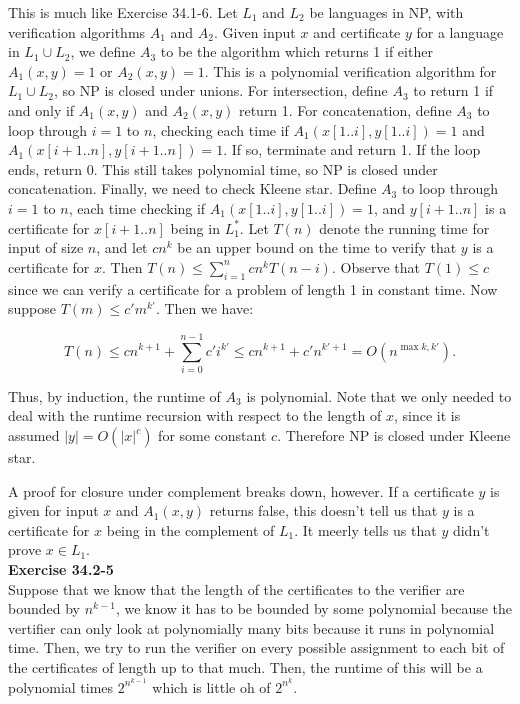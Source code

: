 \documentclass{article}
\begin{document}
This is much like Exercise 34.1-6.  Let $L_1$ and $L_2$ be languages in NP, with verification algorithms $A_1$ and $A_2$.  Given input $x$ and certificate $y$ for a language in $L_1 \cup L_2$, we define $A_3$ to be the algorithm which returns 1 if either $A_1(x,y) = 1$ or $A_2(x,y) = 1$. This is a polynomial verification algorithm for $L_1 \cup L_2$, so NP is closed under unions. For intersection, define $A_3$ to return 1 if and only if $A_1(x,y)$ and $A_2(x,y)$ return 1.  For concatenation, define $A_3$ to loop through $i=1$ to $n$, checking each time if $A_1(x[1..i], y[1..i]) = 1$ and $A_1(x[i+1..n],y[i+1..n])=1$.  If so, terminate and return 1. If the loop ends, return 0.  This still takes polynomial time, so NP is closed under concatenation.  Finally, we need to check Kleene star.  Define $A_3$ to loop through $i=1$ to $n$, each time checking if $A_1(x[1..i], y[1..i]) = 1$, and $y[i+1..n]$ is a certificate for $x[i+1..n]$ being in $L_1^*$.  Let $T(n)$ denote the running time for input of size $n$, and let $cn^k$ be an upper bound on the time to verify that $y$ is a certificate for $x$.  Then $T(n) \leq \sum_{i=1}^n cn^k T(n-i)$.  Observe that $T(1) \leq c$ since we can verify a certificate for a problem of length 1 in constant time.  Now suppose $T(m) \leq c'm^{k'}$.  Then we have:

\[ T(n) \leq cn^{k+1} + \sum_{i=0}^{n-1} c'i^{k'} \leq cn^{k+1} + c'n^{k'+1} = O(n^{\max{k, k'}}).\]

Thus, by induction, the runtime of $A_3$ is polynomial.  Note that we only needed to deal with the runtime recursion with respect to the length of $x$, since it is assumed $|y| = O(|x|^c)$ for some constant $c$.  Therefore NP is closed under Kleene star. 

A proof for closure under complement breaks down, however.  If a certificate $y$ is given for input $x$ and $A_1(x,y)$ returns false, this doesn't tell us that $y$ is a certificate for $x$ being in the complement of $L_1$.  It meerly tells us that $y$ didn't prove $x \in L_1$. \\

\noindent\textbf{Exercise 34.2-5}\\

Suppose that we know that the length of the certificates to the verifier are bounded by $n^{k-1}$, we know it has to be bounded by some polynomial because the vertifier can only look at polynomially many bits because it runs in polynomial time. Then, we try to run the verifier on every possible assignment to each bit of the certificates of length up to that much. Then, the runtime of this will be a polynomial times $2^{n^{k-1}}$ which is little oh of $2^{n^k}$.\\
\end{document}
